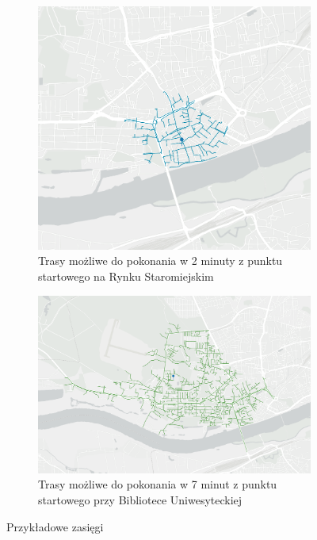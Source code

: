 \documentclass{article}
\begin{document}
\begin{figure}[H]
    \centering
    \begin{subfigure}[b]{0.35\textwidth}
        \centering
        \includegraphics[width=\textwidth]{img/rynek-2-min.png}
        \caption{Trasy możliwe do pokonania w 2 minuty z punktu startowego na Rynku Staromiejskim}
    \end{subfigure}
    \hfill
    \begin{subfigure}[b]{0.55\textwidth}
        \centering
        \includegraphics[width=\textwidth]{img/umk-7-min.png}
        \caption{Trasy możliwe do pokonania w 7 minut z punktu startowego przy Bibliotece Uniwesyteckiej}
    \end{subfigure}
    \caption{Przykładowe zasięgi}
\end{figure}
\end{document}
